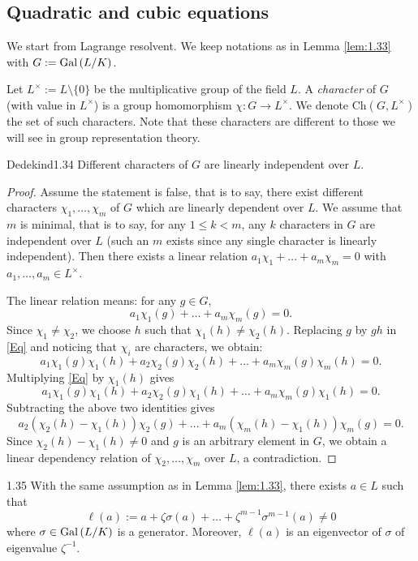 \documentclass[twoside = false,	%
		headsepline,		%
		parskip = true,
		]{scrbook}						%
\begin{document}
    \subsection*{Quadratic and cubic equations}

    {\color{blue}We start from Lagrange resolvent. We keep notations as in Lemma \ref{lem:1.33} with $G:=\mathrm{Gal}\left( L/K\right)$.
    
    Let $L^\times:=L\setminus\{0\}$ be the multiplicative group of the field $L$. A \emph{character} of $G$ (with value in $L^\times$) is a group homomorphism $\chi:G\to L^\times$. We denote $\mathrm{Ch}(G,L^\times)$ the set of such characters. Note that these characters are different to those we will see in group representation theory.
    
    \begin{lemma}{Dedekind}{1.34}
        Different characters of $G$ are linearly independent over $L$.
    \end{lemma}

    \begin{proof}
    Assume the statement is false, that is to say, there exist different characters $\chi_1,\ldots,\chi_m$ of $G$ which are linearly dependent over $L$. We assume that $m$ is minimal, that is to say, for any $1\leq k<m$, any $k$ characters in $G$ are independent over $L$ (such an $m$ exists since any single character is linearly independent). Then there exists a linear relation $a_1\chi_1+\ldots+a_m\chi_m=0$ with $a_1,\ldots,a_m\in L^\times$. 

    The linear relation means: for any $g\in G$, 
    \begin{equation}\label{Eq}
    a_1\chi_1(g)+\ldots+a_m\chi_m(g)=0.
    \end{equation} 
    Since $\chi_1\neq \chi_2$, we choose $h$ such that $\chi_1(h)\neq\chi_2(h)$. Replacing $g$ by $gh$ in \eqref{Eq} and noticing that $\chi_i$ are characters, we obtain:
    $$a_1\chi_1(g)\chi_1(h)+a_2\chi_2(g)\chi_2(h)+\ldots+a_m\chi_m(g)\chi_m(h)=0.$$
    Multiplying \eqref{Eq} by $\chi_1(h)$ gives
    $$a_1\chi_1(g)\chi_1(h)+a_2\chi_2(g)\chi_1(h)+\ldots+a_m\chi_m(g)\chi_1(h)=0.$$
    Subtracting the above two identities gives
    $$a_2(\chi_2(h)-\chi_1(h))\chi_2(g)+\ldots+a_m(\chi_m(h)-\chi_1(h))\chi_m(g)=0.$$
    Since $\chi_2(h)-\chi_1(h)\neq 0$ and $g$ is an arbitrary element in $G$, we obtain a linear dependency relation of $\chi_2,\ldots,\chi_m$ over $L$, a contradiction.
    \end{proof}


    \begin{corollary}{}{1.35}
        With the same assumption as in Lemma \ref{lem:1.33}, there exists $a\in L$ such that $$\ell(a):=a+\zeta\sigma(a)+\ldots+\zeta^{m-1}\sigma^{m-1}(a)\neq 0$$
        where $\sigma\in\mathrm{Gal}\left( L/K\right)$ is a generator. Moreover, $\ell(a)$ is an eigenvector of $\sigma$ of eigenvalue $\zeta^{-1}$.
    \end{corollary}

}
\end{document}
